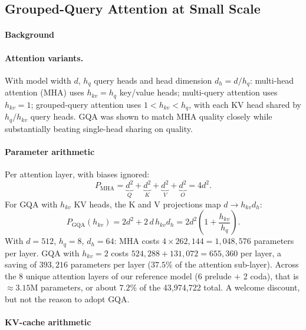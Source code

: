 \subsection{Grouped-Query Attention at Small Scale}
\label{ch-gqa}

\paragraph{Background}

\paragraph{Attention variants.} With model width $d$, $h_q$ query
heads and head dimension $d_h = d/h_q$: multi-head attention (MHA)
uses $h_{kv} = h_q$ key/value heads; multi-query attention uses
$h_{kv} = 1$; grouped-query attention \citep{ainslie2023gqa} uses
$1 < h_{kv} < h_q$, with each KV head shared by $h_q/h_{kv}$ query
heads. GQA was shown to match MHA quality closely while
substantially beating single-head sharing on quality.

\paragraph{Parameter arithmetic}
\label{sec:params}

Per attention layer, with biases ignored:
\begin{equation}
  P_{\mathrm{MHA}} = \underbrace{d^2}_{Q} + \underbrace{d^2}_{K}
  + \underbrace{d^2}_{V} + \underbrace{d^2}_{O} = 4d^2.
\end{equation}
For GQA with $h_{kv}$ KV heads, the K and V projections map
$d \to h_{kv} d_h$:
\begin{equation}
  P_{\mathrm{GQA}}(h_{kv}) = 2d^2 + 2\,d\,h_{kv}d_h
  = 2d^2\left(1 + \frac{h_{kv}}{h_q}\right).
\end{equation}
With $d = 512$, $h_q = 8$, $d_h = 64$: MHA costs
$4 \times 262{,}144 = 1{,}048{,}576$ parameters per layer. GQA with
$h_{kv} = 2$ costs $524{,}288 + 131{,}072 = 655{,}360$ per layer, a
saving of $393{,}216$ parameters per layer ($37.5\%$ of the
attention sub-layer). Across the 8 unique attention layers of our
reference model (6 prelude $+$ 2 coda), that is $\approx 3.15$M
parameters, or about $7.2\%$ of the 43,974,722 total. A welcome
discount, but not the reason to adopt GQA.

\paragraph{KV-cache arithmetic}
\label{sec:cache}

